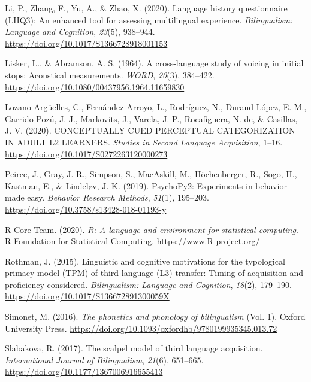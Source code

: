 \documentclass[
  man,floatsintext]{apa6}
\newlength{\cslhangindent}
\newlength{\cslentryspacingunit} %
\newenvironment{CSLReferences}[2] %
 {%
  \setlength{\parindent}{0pt}
  \ifodd #1
  \let\oldpar\par
  \def\par{\hangindent=\cslhangindent\oldpar}
  \fi
  \setlength{\parskip}{#2\cslentryspacingunit}
 }%
 {}
\begin{document}
\begin{CSLReferences}{1}{0}
\leavevmode{}%
Li, P., Zhang, F., Yu, A., \& Zhao, X. (2020). Language history questionnaire ({LHQ}3): An enhanced tool for assessing multilingual experience. \emph{Bilingualism: Language and Cognition}, \emph{23}(5), 938--944. \url{https://doi.org/10.1017/S1366728918001153}

\leavevmode{}%
Lisker, L., \& Abramson, A. S. (1964). A cross-language study of voicing in initial stops: Acoustical measurements. \emph{\emph{WORD}}, \emph{20}(3), 384--422. \url{https://doi.org/10.1080/00437956.1964.11659830}

\leavevmode{}%
Lozano-Argüelles, C., Fernández Arroyo, L., Rodríguez, N., Durand López, E. M., Garrido Pozú, J. J., Markovits, J., Varela, J. P., Rocafiguera, N. de, \& Casillas, J. V. (2020). {CONCEPTUALLY} {CUED} {PERCEPTUAL} {CATEGORIZATION} {IN} {ADULT} L2 {LEARNERS}. \emph{Studies in Second Language Acquisition}, 1--16. \url{https://doi.org/10.1017/S0272263120000273}

\leavevmode{}%
Peirce, J., Gray, J. R., Simpson, S., MacAskill, M., Höchenberger, R., Sogo, H., Kastman, E., \& Lindeløv, J. K. (2019). {PsychoPy}2: Experiments in behavior made easy. \emph{Behavior Research Methods}, \emph{51}(1), 195--203. \url{https://doi.org/10.3758/s13428-018-01193-y}

\leavevmode{}%
R Core Team. (2020). \emph{R: A language and environment for statistical computing}. R Foundation for Statistical Computing. \url{https://www.R-project.org/}

\leavevmode{}%
Rothman, J. (2015). Linguistic and cognitive motivations for the typological primacy model ({TPM}) of third language (L3) transfer: Timing of acquisition and proficiency considered. \emph{Bilingualism: Language and Cognition}, \emph{18}(2), 179--190. \url{https://doi.org/10.1017/S136672891300059X}

\leavevmode{}%
Simonet, M. (2016). \emph{The phonetics and phonology of bilingualism} (Vol. 1). Oxford University Press. \url{https://doi.org/10.1093/oxfordhb/9780199935345.013.72}

\leavevmode{}%
Slabakova, R. (2017). The scalpel model of third language acquisition. \emph{International Journal of Bilingualism}, \emph{21}(6), 651--665. \url{https://doi.org/10.1177/1367006916655413}


\end{CSLReferences}
\end{document}

